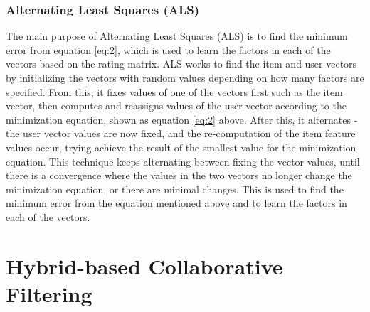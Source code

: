 

\subsubsection{Alternating Least Squares (ALS)} \label{als}

The main purpose of Alternating Least Squares (ALS) is to find the minimum error from equation \ref{eq:2}, which is used to learn the factors in each of the vectors based on the rating matrix. ALS works to find the item and user vectors by initializing the vectors with random values depending on how many factors are specified. From this, it fixes values of one of the vectors first such as the item vector, then computes and reassigns values of the user vector according to the minimization equation, shown as equation \ref{eq:2} above. After this, it alternates - the user vector values are now fixed, and the re-computation of the item feature values occur, trying achieve the result of the smallest value for the minimization equation. This technique keeps alternating between fixing the vector values, until there is a convergence where the values in the two vectors no longer change the minimization equation, or there are minimal changes. This is used to find the minimum error from the equation mentioned above and to learn the factors in each of the vectors. 


\section{Hybrid-based Collaborative Filtering}


